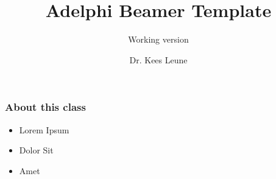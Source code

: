 \documentclass[handout]{beamer}
\title{Adelphi Beamer Template}
\subtitle{Working version}
\author{Dr. Kees Leune}
\institute{Adelphi University}
\date{}
\begin{document}
\begin{frame}
\titlepage
\end{frame}


\begin{frame}
\frametitle{About this class}

\begin{itemize}
\item Lorem Ipsum
\item Dolor Sit
\item Amet
\end{itemize}
\end{frame}
\end{document}
